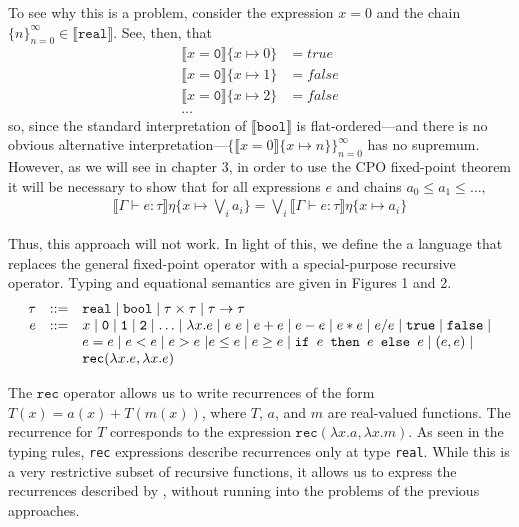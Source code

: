 To see why this is a problem, consider the expression $x = 0$ and the chain $\{n\}_{n=0}^{\infty} \in \llbracket 
\texttt{real} \rrbracket$. See, then, that
\begin{align*}
\llbracket x = \texttt{0} \rrbracket\{x \mapsto 0\} &= true \\
\llbracket x = \texttt{0} \rrbracket\{x \mapsto 1\} &= false \\
\llbracket x = \texttt{0} \rrbracket\{x \mapsto 2\} &= false \\
\ldots
\end{align*}
so, since the standard interpretation of $\llbracket \texttt{bool} \rrbracket$ is flat-ordered---and there is no obvious
alternative interpretation---$\{\llbracket x = 0\rrbracket\{x \mapsto n\}\}_{n=0}^{\infty}$ has no supremum. However, as we will see in chapter 3,
in order to use the CPO fixed-point theorem it will be necessary to show that for all expressions $e$
and chains $a_0 \leq a_1 \leq \ldots,$
\begin{align*}
  \llbracket \Gamma \vdash e : \tau \rrbracket\eta\{x\mapsto \bigvee_i a_i\}
  = \bigvee_i \llbracket \Gamma \vdash e : \tau \rrbracket\eta\{x \mapsto a_i\}
\end{align*}

Thus, this approach will not work. In light of this, we define the a language that replaces the general fixed-point operator
with a special-purpose recursive operator. Typing and equational semantics are given in Figures 1 and 2.
\[
\begin{array}{rcl}
\tau &::=& \texttt{real} \mid \texttt{bool} \mid \tau \times \tau \mid \tau \rightarrow \tau \\
e &::=& x  \mid \texttt{0} \mid \texttt{1} \mid \texttt{2} \mid \dotsc \mid \lambda x.e \mid e \ e \mid e + e \mid e - e \mid  e  *  e \mid e / e \mid \texttt{true} \mid \texttt{false} \mid \\
  && e  =  e \mid e < e \mid e > e \ | e \leq e \mid e \geq e \mid 
     \texttt{if } e \texttt{ then } e \texttt{ else } e \mid (e,e) \mid \\
    && \texttt{rec}(\lambda x.e, \lambda x.e) 
\end{array}
\]

The $\texttt{rec}$ operator allows us to write 
recurrences of the form $T(x) = a(x) + T(m(x))$, where $T$, $a$, and $m$ are real-valued functions.
The recurrence for $T$ corresponds to the expression $\texttt{rec}(\lambda x.a, \lambda x.m)$. As seen in the typing
rules, \texttt{rec} expressions describe recurrences only at type \texttt{real}.
 While this is a very restrictive subset of recursive functions, it allows us to express the recurrences described by 
 \cite[\S1]{Karp}, without running into the problems of the previous approaches. 

